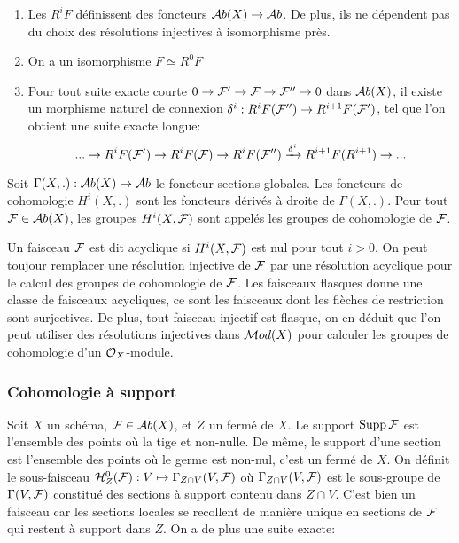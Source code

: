 \begin{thm}
\begin{enumerate}
\item Les $R^i F$ définissent des foncteurs $\mathcal{A} b(X)\rightarrow \mathcal{A} b$. De plus, ils ne dépendent pas du choix des résolutions injectives à isomorphisme près.
\item On a un isomorphisme $F\simeq R^0F$
\item Pour tout suite exacte courte $0\rightarrow \mathcal{F}'\rightarrow \mathcal{F} \rightarrow \mathcal{F}'' \rightarrow 0$ dans $\mathcal{A} b(X)$, il existe un morphisme naturel de connexion $\delta^i:R^iF(\mathcal{F}'')\rightarrow R^{i+1}F(\mathcal{F}')$, tel que l'on obtient une suite exacte longue:
$$...\rightarrow R^iF(\mathcal{F}') \rightarrow R^iF(\mathcal{F}) \rightarrow R^iF(\mathcal{F}'') \xrightarrow{\delta ^i} R^{i+1}F(R^{i+1}) \rightarrow ...$$
\end{enumerate}
\end{thm}

\begin{defn}
Soit $\Gamma(X,.):\mathcal{A} b(X)\rightarrow \mathcal{A} b$ le foncteur sections globales. Les foncteurs de cohomologie $H^i(X,.)$ sont les foncteurs dérivés à droite de $\Gamma(X,.)$. Pour tout $\mathcal{F}\in \mathcal{A} b(X)$, les groupes $H^i(X,\mathcal{F})$ sont appelés les groupes de cohomologie de $\mathcal{F}$.
\end{defn}


Un faisceau $\mathcal{F}$ est dit acyclique si $H^i(X,\mathcal{F})$ est nul pour tout $i>0$. On peut toujour remplacer une résolution injective de $\mathcal{F}$ par une résolution acyclique pour le calcul des groupes de cohomologie de $\mathcal{F}$. Les faisceaux flasques donne une classe de faisceaux acycliques, ce sont les faisceaux dont les flèches de restriction sont surjectives. De plus, tout faisceau injectif est flasque, on en déduit que l'on peut utiliser des résolutions injectives dans $\mathcal{M} od(X)$ pour calculer les groupes de cohomologie d'un $\mathcal{O}_X$-module.

\subsubsection{Cohomologie à support}

Soit $X$ un schéma, $\mathcal{F}\in \mathcal{A} b(X)$, et $Z$ un fermé de $X$. Le support $\operatorname{Supp}\mathcal{F}$ est l'ensemble des points où la tige et non-nulle. De même, le support d'une section est l'ensemble des points où le germe est non-nul, c'est un fermé de $X$. On définit le sous-faisceau $\mathcal{H} ^0 _Z(\mathcal{F}):V\mapsto \Gamma_{Z\cap V}(V,\mathcal{F})$ où $\Gamma_{Z\cap V}(V,\mathcal{F})$ est le sous-groupe de $\Gamma(V,\mathcal{F})$ constitué des sections à support contenu dans $Z\cap V$. C'est bien un faisceau car les sections locales se recollent de manière unique en sections de $\mathcal{F}$ qui restent à support dans $Z$. On a de plus une suite exacte:



